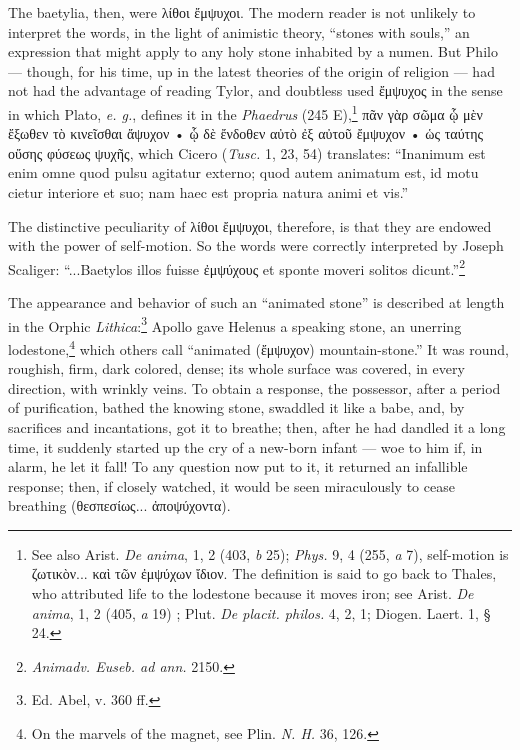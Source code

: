 \documentclass[a4paper, 12pt, oneside, polutonikogreek, english]{article}
\begin{document}
The baetylia, then, were λίθοι ἔμψυχοι. The modern reader is not unlikely to interpret the words, in the light of animistic theory, ``stones with souls,'' an expression that might apply to any holy stone inhabited by a numen. But Philo --- though, for his time, up in the latest theories of the origin of religion --- had not had the advantage of reading Tylor, and doubtless used ἔμψυχος in the sense in which Plato, \emph{e. g.}, defines it in the \emph{Phaedrus} (245 E),\footnote{See also Arist. \emph{De anima}, 1, 2 (403, \emph{b} 25); \emph{Phys.} 9, 4 (255, \emph{a} 7), self-motion is ζωτικὸν... καὶ τῶν ἐμψύχων ἴδιον. The definition is said to go back to Thales, who attributed life to the lodestone because it moves iron; see Arist. \emph{De anima}, 1, 2 (405, \emph{a} 19) ; Plut. \emph{De placit. philos.} 4, 2, 1; Diogen. Laert. 1, § 24.} πᾶν γὰρ σῶμα ᾧ μὲν ἔξωθεν τὸ κινεῖσθαι ἄψυχον • ᾧ δὲ ἔνδοθεν αὐτὸ ἐξ αὐτοῦ ἔμψυχον • ὡς ταύτης οὔσης φύσεως ψυχῆς, which Cicero (\emph{Tusc.} 1, 23, 54) translates: ``Inanimum est enim omne quod pulsu agitatur externo; quod autem animatum est, id motu cietur interiore et suo; nam haec est propria natura animi et vis.''

The distinctive peculiarity of λίθοι ἔμψυχοι, therefore, is that they are endowed with the power of self-motion. So the words were correctly interpreted by Joseph Scaliger: ``...Baetylos illos fuisse ἐμψύχους et sponte moveri solitos dicunt.''\footnote{\emph{Animadv. Euseb. ad ann.} 2150.}

The appearance and behavior of such an ``animated stone'' is described at length in the Orphic \emph{Lithica}:\footnote{Ed. Abel, v. 360 ff.} Apollo gave Helenus a speaking stone, an unerring lodestone,\footnote{On the marvels of the magnet, see Plin. \emph{N. H.} 36, 126.} which others call ``animated (ἔμψυχον) mountain-stone.'' It was round, roughish, firm, dark colored, dense; its whole surface was covered, in every direction, with wrinkly veins. To obtain a response, the possessor, after a period of purification, bathed the knowing stone, swaddled it like a babe, and, by sacrifices and incantations, got it to breathe; then, after he had dandled it a long time, it suddenly started up the cry of a new-born infant --- woe to him if, in alarm, he let it fall! To any question now put to it, it returned an infallible response; then, if closely watched, it would be seen miraculously to cease breathing (θεσπεσίως... ἀποψύχοντα).
\end{document}

